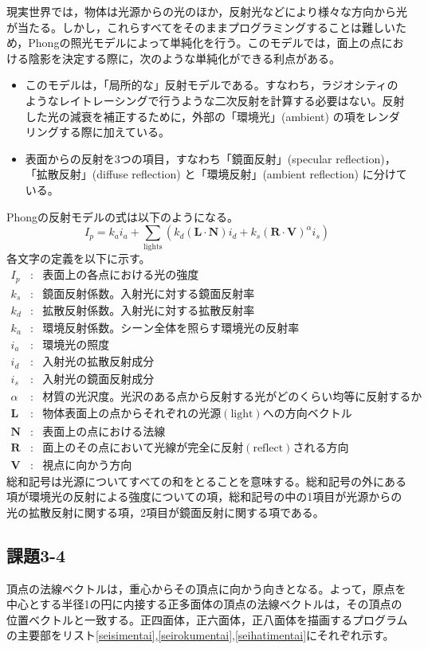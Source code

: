 \documentclass[]{jsarticle}
\begin{document}
現実世界では，物体は光源からの光のほか，反射光などにより様々な方向から光が当たる。しかし，これらすべてをそのままプログラミングすることは難しいため，Phongの照光モデルによって単純化を行う。このモデルでは，面上の点における陰影を決定する際に，次のような単純化ができる利点がある。
\begin{itemize}
\item このモデルは，「局所的な」反射モデルである。すなわち，ラジオシティのようなレイトレーシングで行うような二次反射を計算する必要はない。反射した光の減衰を補正するために，外部の「環境光」(ambient) の項をレンダリングする際に加えている。
\item 表面からの反射を3つの項目，すなわち「鏡面反射」(specular reflection)，「拡散反射」(diffuse reflection) と「環境反射」(ambient reflection) に分けている。
\end{itemize}
Phongの反射モデルの式は以下のようになる。
$$
I_p=k_a i_a + \sum_{\mathrm{lights}} (k_d (\bm{L}\cdot \bm{N})i_d + k_s(\bm{R}\cdot \bm{V})^\alpha i_s)
$$
各文字の定義を以下に示す。
\begin{eqnarray*}
I_p&:&表面上の各点における光の強度\\
k_s&:&鏡面反射係数。入射光に対する鏡面反射率\\
k_d&:&拡散反射係数。入射光に対する拡散反射率\\
k_a&:&環境反射係数。シーン全体を照らす環境光の反射率\\
i_a&:&環境光の照度\\
i_d&:&入射光の拡散反射成分\\
i_s&:&入射光の鏡面反射成分\\
\alpha&:&材質の光沢度。光沢のある点から反射する光がどのくらい均等に反射するか\\
\bm{L}&:&物体表面上の点からそれぞれの光源 (\mathrm{light}) への方向ベクトル\\
\bm{N}&:&表面上の点における法線\\
\bm{R}&:&面上のその点において光線が完全に反射 (\mathrm{reflect}) される方向\\
\bm{V}&:&視点に向かう方向
\end{eqnarray*}
総和記号は光源についてすべての和をとることを意味する。総和記号の外にある項が環境光の反射による強度についての項，総和記号の中の1項目が光源からの光の拡散反射に関する項，2項目が鏡面反射に関する項である。


\subsection{課題3-4}
頂点の法線ベクトルは，重心からその頂点に向かう向きとなる。よって，原点を中心とする半径1の円に内接する正多面体の頂点の法線ベクトルは，その頂点の位置ベクトルと一致する。正四面体，正六面体，正八面体を描画するプログラムの主要部をリスト\ref{seisimentai},\ref{seirokumentai},\ref{seihatimentai}にそれぞれ示す。
\end{document}
